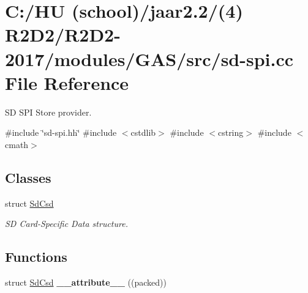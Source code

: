 \hypertarget{sd-spi_8cc}{}\section{C\+:/\+HU (school)/jaar2.2/(4) R2\+D2/\+R2\+D2-\/2017/modules/\+G\+A\+S/src/sd-\/spi.cc File Reference}
\label{sd-spi_8cc}


SD S\+PI Store provider.  


{\ttfamily \#include \char`\"{}sd-\/spi.\+hh\char`\"{}}\newline
{\ttfamily \#include $<$cstdlib$>$}\newline
{\ttfamily \#include $<$cstring$>$}\newline
{\ttfamily \#include $<$cmath$>$}\newline
\subsection*{Classes}
\begin{DoxyCompactItemize}
\item 
struct \hyperlink{struct_sd_csd}{Sd\+Csd}
\begin{DoxyCompactList}\small\item\em SD Card-\/\+Specific Data structure. \end{DoxyCompactList}\end{DoxyCompactItemize}
\subsection*{Functions}
\begin{DoxyCompactItemize}
\item 
\mbox{\label{sd-spi_8cc_a65cc01dcd598989a32314bc110f023c6}} 
struct \hyperlink{struct_sd_csd}{Sd\+Csd} {\bfseries \+\_\+\+\_\+attribute\+\_\+\+\_\+} ((packed))
\end{DoxyCompactItemize}
